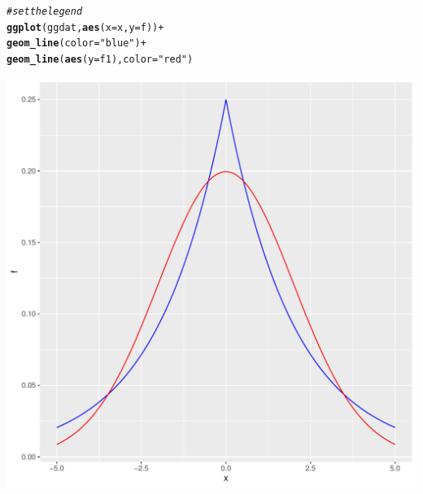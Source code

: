 \documentclass{article}\usepackage[]{graphicx}\usepackage[]{color}
\makeatletter
\def\maxwidth{ %
  \ifdim\Gin@nat@width>\linewidth
    \linewidth
  \else
    \Gin@nat@width
  \fi
}
\newcommand{\hlstr}[1]{\textcolor[rgb]{0.192,0.494,0.8}{#1}}%
\newcommand{\hlcom}[1]{\textcolor[rgb]{0.678,0.584,0.686}{\textit{#1}}}%
\newcommand{\hlopt}[1]{\textcolor[rgb]{0,0,0}{#1}}%
\newcommand{\hlstd}[1]{\textcolor[rgb]{0.345,0.345,0.345}{#1}}%
\newcommand{\hlkwc}[1]{\textcolor[rgb]{0.333,0.667,0.333}{#1}}%
\newcommand{\hlkwd}[1]{\textcolor[rgb]{0.737,0.353,0.396}{\textbf{#1}}}%
\newenvironment{kframe}{%
 \def\at@end@of@kframe{}%
 \ifinner\ifhmode%
  \def\at@end@of@kframe{\end{minipage}}%
  \begin{minipage}{\columnwidth}%
 \fi\fi%
 \def\FrameCommand##1{\hskip\@totalleftmargin \hskip-\fboxsep
 \colorbox{shadecolor}{##1}\hskip-\fboxsep
     \hskip-\linewidth \hskip-\@totalleftmargin \hskip\columnwidth}%
 \MakeFramed {\advance\hsize-\width
   \@totalleftmargin\z@ \linewidth\hsize
   \@setminipage}}%
 {\par\unskip\endMakeFramed%
 \at@end@of@kframe}
\newenvironment{knitrout}{}{} %
\makeatother
\begin{document}
\begin{enumerate}
\begin{enumerate}
\begin{knitrout}
\begin{kframe}
\begin{alltt}
\hlcom{#set the legend}
\hlkwd{ggplot}\hlstd{(ggdat,} \hlkwd{aes}\hlstd{(}\hlkwc{x}\hlstd{=x,} \hlkwc{y}\hlstd{=f))}\hlopt{+}
  \hlkwd{geom_line}\hlstd{(}\hlkwc{color}\hlstd{=}\hlstr{"blue"}\hlstd{)}\hlopt{+}
  \hlkwd{geom_line}\hlstd{(}\hlkwd{aes}\hlstd{(}\hlkwc{y}\hlstd{=f1),} \hlkwc{color}\hlstd{=}\hlstr{"red"}\hlstd{)}
\end{alltt}
\end{kframe}
\includegraphics[width=\maxwidth]{figure/unnamed-chunk-4-1} 
\end{knitrout}
  

\end{enumerate}
\end{enumerate}
\end{document}
